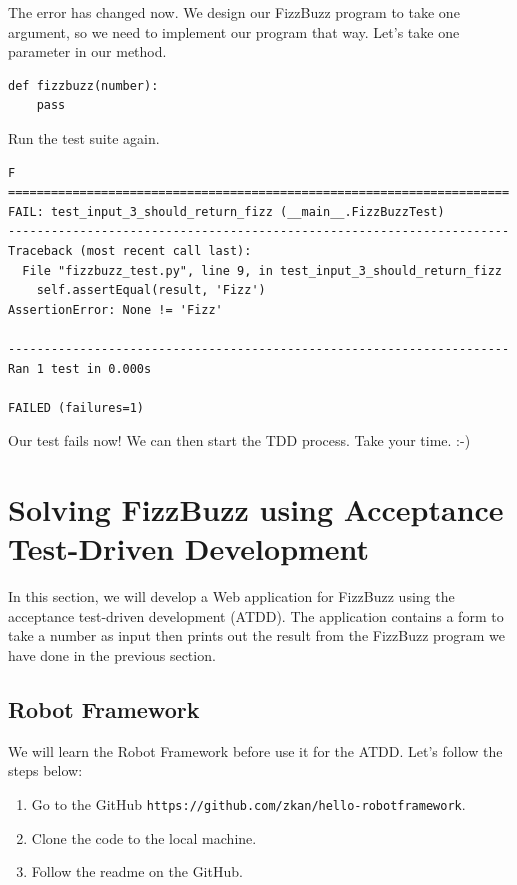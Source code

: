 \documentclass{article}
\begin{document}
\noindent The error has changed now. We design our FizzBuzz program to take one
argument, so we need to implement our program that way. Let's take one
parameter in our method. \\

\begin{verbatim}
def fizzbuzz(number):
    pass
\end{verbatim}

\noindent Run the test suite again.

\begin{verbatim}
F
======================================================================
FAIL: test_input_3_should_return_fizz (__main__.FizzBuzzTest)
----------------------------------------------------------------------
Traceback (most recent call last):
  File "fizzbuzz_test.py", line 9, in test_input_3_should_return_fizz
    self.assertEqual(result, 'Fizz')
AssertionError: None != 'Fizz'

----------------------------------------------------------------------
Ran 1 test in 0.000s

FAILED (failures=1)
\end{verbatim}

\noindent Our test fails now! We can then start the TDD process. Take your
time. :-)

\section*{Solving FizzBuzz using Acceptance Test-Driven Development}

\noindent In this section, we will develop a Web application for FizzBuzz using
the acceptance test-driven development (ATDD). The application contains a form
to take a number as input then prints out the result from the FizzBuzz program
we have done in the previous section.

\subsection*{Robot Framework}

\noindent We will learn the Robot Framework before use it for the ATDD. Let's
follow the steps below:

\begin{enumerate}
  \item Go to the GitHub {\tt https://github.com/zkan/hello-robotframework}.
  \item Clone the code to the local machine.
  \item Follow the readme on the GitHub.
\end{enumerate}
\end{document}
